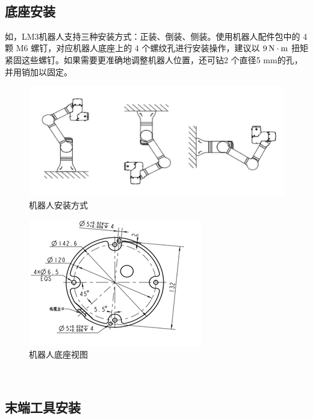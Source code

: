  
\subsection{底座安装}
如，LM3机器人支持三种安装方式：正装、倒装、侧装。使用机器人配件包中的 4 颗 M6 螺钉，对应机器人底座上的 4 个螺纹孔进行安装操作，建议以 $9\,\mathrm{N\cdot m}$ 扭矩紧固这些螺钉。如果需要更准确地调整机器人位置，还可钻2 个直径5 mm的孔，并用销加以固定。
  

\begin{figure}[ht]
    \centering
    \includegraphics[width=\textwidth]{image/1-4-direction.jpg}
    \caption{机器人安装方式}
    \label{fig:机器人安装方式}
\end{figure}

 
\begin{figure}[ht]
    \centering
    \includegraphics{image/1-5-base.png}
    \caption{机器人底座视图}
    \label{fig:机器人底座视图}
\end{figure}





 

 
 
\subsection{末端工具安装}

